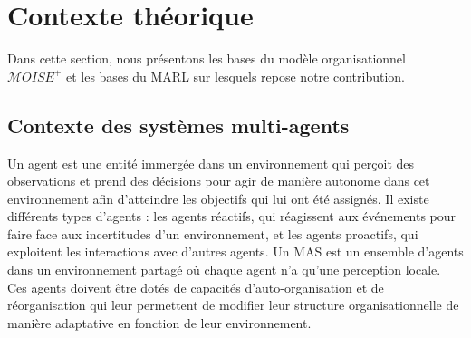 
\section{Contexte théorique}






Dans cette section, nous présentons les bases du modèle organisationnel $\mathcal{M}OISE^+$ et les bases du MARL sur lesquels repose notre contribution.

\subsection{Contexte des systèmes multi-agents}


Un agent est une entité immergée dans un environnement qui perçoit des observations et prend des décisions pour agir de manière autonome dans cet environnement afin d'atteindre les objectifs qui lui ont été assignés.
Il existe différents types d'agents : les agents réactifs, qui réagissent aux événements pour faire face aux incertitudes d'un environnement, et les agents proactifs, qui exploitent les interactions avec d'autres agents. Un MAS est un ensemble d'agents dans un environnement partagé où chaque agent n'a qu'une perception locale. Ces agents doivent être dotés de capacités d'auto-organisation et de réorganisation qui leur permettent de modifier leur structure organisationnelle de manière adaptative en fonction de leur environnement.

